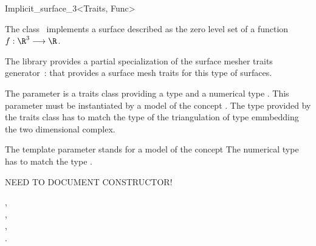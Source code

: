 

\begin{ccRefClass}{Implicit_surface_3<Traits, Func>}  %


\ccDefinition
  
The class \ccRefName\  implements a surface described 
as the zero level
set  of a function $f : \R^3 \longrightarrow \R$.


The library provides a partial specialization
of the  surface mesher traits generator~:
that provides a surface mesh traits for this type of surfaces.


The parameter  is a traits class providing 
a type  and a numerical type .
This parameter  must be instantiated by 
a model of the concept .
The  type provided by the traits class  
has to match  the  type of the
triangulation of  type  emmbedding
the two dimensional complex.

The template parameter   stands for a model
of the concept 
The numerical type  has to match
the type .

NEED TO DOCUMENT CONSTRUCTOR!


\ccSeeAlso
{},\\
,\\
, \\
.

\end{ccRefClass}


